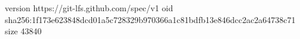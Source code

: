 version https://git-lfs.github.com/spec/v1
oid sha256:1f173e623848dcd01a5c728329b970366a1c81bdfb13e846dcc2ac2a64738c71
size 43840
